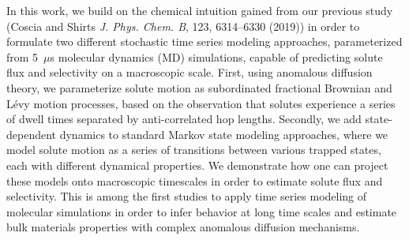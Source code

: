 \documentclass[fontsize=11pt]{article}
\begin{document}
    In this work, we build on the chemical intuition gained from our previous 
    study (Coscia and Shirts \textit{J. Phys.  Chem. B}, 123, 6314--6330 (2019))
    in order to formulate two different stochastic time series modeling approaches,
    parameterized from 5~$\mu$s molecular dynamics (MD) simulations, capable of 
    predicting solute flux and selectivity on a macroscopic scale. 
    First, using anomalous diffusion theory, we parameterize solute motion as 
    subordinated fractional Brownian and L\'evy motion processes, based on the 
    observation that solutes experience a series of dwell times separated by
    anti-correlated hop lengths. Secondly, we add state-dependent dynamics to 
    standard Markov state modeling approaches, where we model solute motion as 
    a series of transitions between various trapped states, each with different
    dynamical properties. We demonstrate how one can project these models 
    onto macroscopic timescales in order to estimate solute flux and selectivity.
    This is among the first studies to apply time series modeling of molecular 
    simulations in order to infer behavior at long time scales and estimate bulk
    materials properties with complex anomalous diffusion mechanisms.
	
\end{document}
